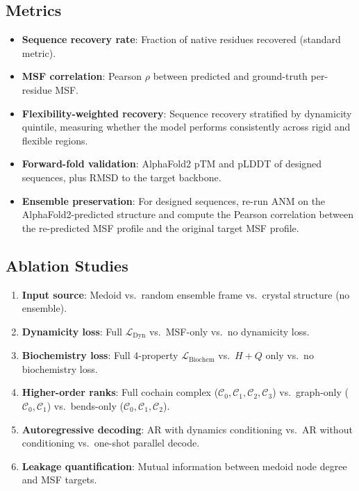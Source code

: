 \documentclass{article}
\begin{document}
\subsection{Metrics}
\begin{itemize}
    \item \textbf{Sequence recovery rate}: Fraction of native residues recovered (standard metric).
    \item \textbf{MSF correlation}: Pearson $\rho$ between predicted and ground-truth per-residue MSF.
    \item \textbf{Flexibility-weighted recovery}: Sequence recovery stratified by dynamicity quintile, measuring whether the model performs consistently across rigid and flexible regions.
    \item \textbf{Forward-fold validation}: AlphaFold2 pTM and pLDDT of designed sequences, plus RMSD to the target backbone.
    \item \textbf{Ensemble preservation}: For designed sequences, re-run ANM on the AlphaFold2-predicted structure and compute the Pearson correlation between the re-predicted MSF profile and the original target MSF profile.
\end{itemize}

\subsection{Ablation Studies}
\label{sec:ablations}
\begin{enumerate}
    \item \textbf{Input source}: Medoid vs.\ random ensemble frame vs.\ crystal structure (no ensemble).
    \item \textbf{Dynamicity loss}: Full $\mathcal{L}_{\text{Dyn}}$ vs.\ MSF-only vs.\ no dynamicity loss.
    \item \textbf{Biochemistry loss}: Full 4-property $\mathcal{L}_{\text{Biochem}}$ vs.\ $H + Q$ only vs.\ no biochemistry loss.
    \item \textbf{Higher-order ranks}: Full cochain complex ($\mathcal{C}_0, \mathcal{C}_1, \mathcal{C}_2, \mathcal{C}_3$) vs.\ graph-only ($\mathcal{C}_0, \mathcal{C}_1$) vs.\ bends-only ($\mathcal{C}_0, \mathcal{C}_1, \mathcal{C}_2$).
    \item \textbf{Autoregressive decoding}: AR with dynamics conditioning vs.\ AR without conditioning vs.\ one-shot parallel decode.
    \item \textbf{Leakage quantification}: Mutual information between medoid node degree and MSF targets.
\end{enumerate}
\end{document}
